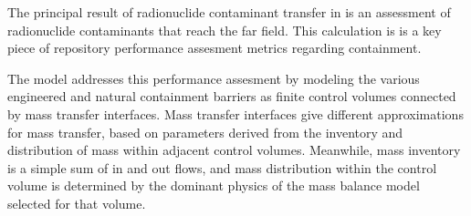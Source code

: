 The principal result of radionuclide contaminant transfer in \Cyder is an 
assessment of radionuclide contaminants that reach the far field. This 
calculation is is a key piece of repository performance assesment metrics 
regarding containment.  

The \Cyder model addresses this performance assesment by modeling the various 
engineered and natural containment barriers as finite control volumes connected 
by mass transfer interfaces. Mass transfer interfaces give different 
approximations for mass transfer, based on parameters derived from the 
inventory and distribution of mass within adjacent control volumes. Meanwhile, 
mass inventory is a simple sum of in and out flows, and mass distribution 
within the control volume is determined by the dominant physics of the mass 
balance model selected for that volume.

